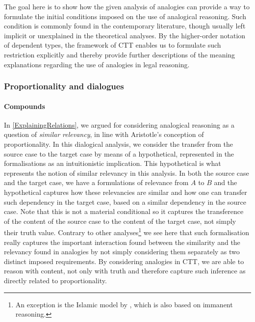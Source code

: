 				The goal here is to show how the given analysis of analogies can provide a way to formulate the initial conditions imposed on the use of analogical reasoning. Such condition is commonly found in the contemporary literature, though usually left implicit or unexplained in the theoretical analyses. By the higher-order notation of dependent types, the framework of CTT enables us to formulate such restriction explicitly and thereby provide further descriptions of the meaning explanations regarding the use of analogies in legal reasoning.	

			\subsubsection{Proportionality and dialogues}
			
				\paragraph{Compounds}
				
				In \autoref{ExplainingRelations}, we argued for considering analogical reasoning as a question of \textit{similar relevancy}, in line with Aristotle's conception of proportionality. In this dialogical analysis, we consider the transfer from the source case to the target case by means of a hypothetical, represented in the formalisations as an intuitionistic implication. This hypothetical is what represents the notion of similar relevancy in this analysis. In both the source case and the target case, we have a formulations of relevance from $A$ to $B$ and the hypothetical captures how these relevancies are similar and how one can transfer such dependency in the target case, based on a similar dependency in the source case. Note that this is not a material conditional so it captures the transference of the content of the source case to the content of the target case, not simply their truth value. Contrary to other analyses\footnote{An exception is the Islamic model by \textcite{Rahman2017}, which is also based on immanent reasoning.} we see here that such formalisation really captures the important interaction found between the similarity and the relevancy found in analogies by not simply considering them separately as two distinct imposed requirements. By considering analogies in CTT, we are able to reason with content, not only with truth and therefore capture such inference as directly related to proportionality.

